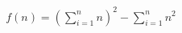 \documentclass{article}
\begin{document}

\begin{align*}
    f(n) = \left( \sum_{i = 1}^{n}{n} \right)^{2} - \sum_{i = 1}^{n}{n^{2}}
\end{align*}
\end{document}

